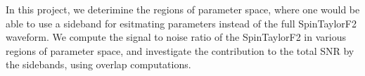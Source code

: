 In this project, we deterimine the regions of parameter space, where
one would be able to use a sideband for esitmating parameters instead of the full SpinTaylorF2 waveform. We compute 
the signal to noise ratio of the SpinTaylorF2 in various regions of parameter space, and investigate the contribution
to the total SNR by the sidebands, using overlap computations.  


